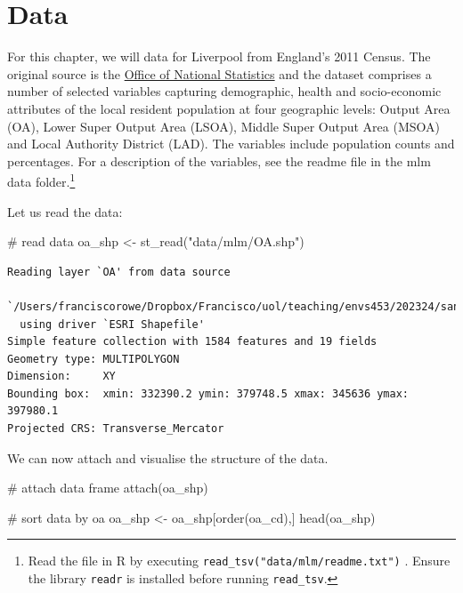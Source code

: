 \documentclass[
  letterpaper,
  DIV=11,
  numbers=noendperiod,
  oneside]{scrreprt}
\newenvironment{Shaded}{\begin{snugshade}}{\end{snugshade}}
\newcommand{\CommentTok}[1]{\textcolor[rgb]{0.37,0.37,0.37}{#1}}
\newcommand{\FunctionTok}[1]{\textcolor[rgb]{0.28,0.35,0.67}{#1}}
\newcommand{\NormalTok}[1]{\textcolor[rgb]{0.00,0.23,0.31}{#1}}
\newcommand{\OtherTok}[1]{\textcolor[rgb]{0.00,0.23,0.31}{#1}}
\newcommand{\StringTok}[1]{\textcolor[rgb]{0.13,0.47,0.30}{#1}}
\begin{document}
\section{Data}\label{data-3}

For this chapter, we will data for Liverpool from England's 2011 Census.
The original source is the
\href{https://www.nomisweb.co.uk/home/census2001.asp}{Office of National
Statistics} and the dataset comprises a number of selected variables
capturing demographic, health and socio-economic attributes of the local
resident population at four geographic levels: Output Area (OA), Lower
Super Output Area (LSOA), Middle Super Output Area (MSOA) and Local
Authority District (LAD). The variables include population counts and
percentages. For a description of the variables, see the readme file in
the mlm data folder.\footnote{Read the file in R by executing
  \texttt{read\_tsv("data/mlm/readme.txt")} . Ensure the library
  \texttt{readr} is installed before running \texttt{read\_tsv}.}

Let us read the data:

\begin{Shaded}
\begin{Highlighting}[]
\CommentTok{\# read data}
\NormalTok{oa\_shp }\OtherTok{\textless{}{-}} \FunctionTok{st\_read}\NormalTok{(}\StringTok{"data/mlm/OA.shp"}\NormalTok{)}
\end{Highlighting}
\end{Shaded}

\begin{verbatim}
Reading layer `OA' from data source 
  `/Users/franciscorowe/Dropbox/Francisco/uol/teaching/envs453/202324/san/data/mlm/OA.shp' 
  using driver `ESRI Shapefile'
Simple feature collection with 1584 features and 19 fields
Geometry type: MULTIPOLYGON
Dimension:     XY
Bounding box:  xmin: 332390.2 ymin: 379748.5 xmax: 345636 ymax: 397980.1
Projected CRS: Transverse_Mercator
\end{verbatim}

We can now attach and visualise the structure of the data.

\begin{Shaded}
\begin{Highlighting}[]
\CommentTok{\# attach data frame}
\FunctionTok{attach}\NormalTok{(oa\_shp)}

\CommentTok{\# sort data by oa}
\NormalTok{oa\_shp }\OtherTok{\textless{}{-}}\NormalTok{ oa\_shp[}\FunctionTok{order}\NormalTok{(oa\_cd),]}
\FunctionTok{head}\NormalTok{(oa\_shp)}
\end{Highlighting}
\end{Shaded}
\end{document}
